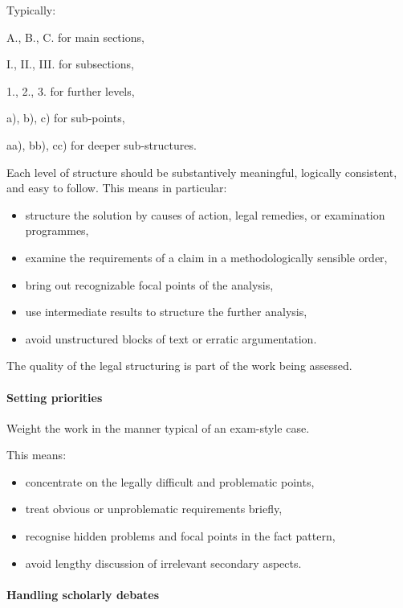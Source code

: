 \documentclass[11pt]{article}
\providecommand{\tightlist}{%
  \setlength{\itemsep}{0pt}\setlength{\parskip}{0pt}}
\begin{document}
Typically:

A., B., C. for main sections,

I., II., III. for subsections,

1., 2., 3. for further levels,

a), b), c) for sub-points,

aa), bb), cc) for deeper sub-structures.

Each level of structure should be substantively meaningful, logically
consistent, and easy to follow. This means in particular:

\begin{itemize}
\tightlist
\item
  structure the solution by causes of action, legal remedies, or
  examination programmes,
\item
  examine the requirements of a claim in a methodologically sensible
  order,
\item
  bring out recognizable focal points of the analysis,
\item
  use intermediate results to structure the further analysis,
\item
  avoid unstructured blocks of text or erratic argumentation.
\end{itemize}

The quality of the legal structuring is part of the work being assessed.

\paragraph{\texorpdfstring{\textbf{Setting
priorities}}{Setting priorities}}\label{setting-priorities}

Weight the work in the manner typical of an exam-style case.

This means:

\begin{itemize}
\tightlist
\item
  concentrate on the legally difficult and problematic points,
\item
  treat obvious or unproblematic requirements briefly,
\item
  recognise hidden problems and focal points in the fact pattern,
\item
  avoid lengthy discussion of irrelevant secondary aspects.
\end{itemize}

\paragraph{Handling scholarly debates}\label{handling-scholarly-debates}
\end{document}
